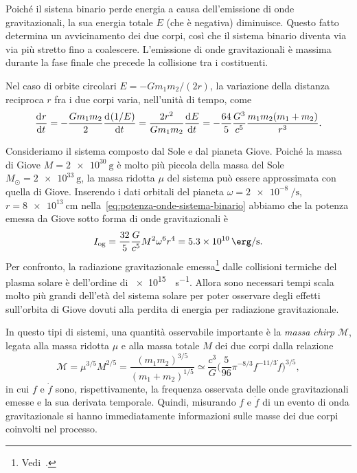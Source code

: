 Poiché il sistena binario perde energia a causa dell'emissione di onde
gravitazionali, la sua energia totale $E$ (che è negativa) diminuisce.  Questo
fatto determina un avvicinamento dei due corpi, così che il sistema binario
diventa via via più stretto fino a coalescere.  L'emissione di onde
gravitazionali è massima durante la fase finale che precede la collisione tra i
costituenti.

Nel caso di orbite circolari $E = -Gm_{1}m_{2}/(2r)$, la variazione della
distanza reciproca $r$ fra i due corpi varia, nell'unità di tempo, come
\begin{equation}
  \frac{{\mathop{}\!\mathrm{d}^{}}r}{\mathop{}\!\mathrm{d} {t}^{}} = -\frac{Gm_{1}m_{2}}{2} \frac{{\mathop{}\!\mathrm{d}^{}}(1/E)}{\mathop{}\!\mathrm{d} {t}^{}} =
  \frac{2r^{2}}{Gm_{1}m_{2}} \frac{{\mathop{}\!\mathrm{d}^{}}E}{\mathop{}\!\mathrm{d} {t}^{}} = -\frac{64}{5}\frac{G^{3}}{c^{5}}
  \frac{m_{1}m_{2}(m_{1} + m_{2})}{r^{3}}.
\end{equation}

Consideriamo il sistema composto dal Sole e dal pianeta Giove.  Poiché la massa
di Giove $M = \SI{2e30}{\gram}$ è molto più piccola della massa del Sole
$M_{\odot} = \SI{2e33}{\gram}$, la massa ridotta $\mu$ del sistema può essere
approssimata con quella di Giove.  Inserendo i dati orbitali del pianeta
$\omega = \SI[per-mode=reciprocal]{2e-8}{\per\second}$,
$r = \SI{8e13}{\centi\metre}$ nella~\eqref{eq:potenza-onde-sistema-binario}
abbiamo che la potenza emessa da Giove sotto forma di onde gravitazionali è
\begin{equation}
  I_{\textup{og}} = \frac{32}{5} \frac{G}{c^{5}} M^{2} \omega^{6} r^{4} =
  \SI{5.3e10}{\erg\per\second}.
\end{equation}
Per confronto, la radiazione gravitazionale
emessa\footnote{Vedi~\textcite[266]{weinberg:gravitation}.}  dalle collisioni
termiche del plasma solare è dell'ordine di \SI{e15}{\erg\per\second}.  Allora
sono necessari tempi scala molto più grandi dell'età del sistema solare per
poter osservare degli effetti sull'orbita di Giove dovuti alla perdita di
energia per radiazione gravitazionale.

In questo tipi di sistemi, una quantità osservabile importante è la \emph{massa
  chirp} \(\mathcal{M}\), legata alla massa ridotta \(\mu\) e alla massa totale
\(M\) dei due corpi dalla relazione~\parencite{2016PhRvL.116f1102A}
\begin{equation}
  \mathcal{M} = \mu^{3/5} M^{2/5} = \frac{(m_{1} m_{2})^{3/5}}{(m_{1} +
    m_{2})^{1/5}} \simeq \frac{c^{3}}{G} \biggl(\frac{5}{96} \pi^{-8/3}
  f^{-11/3} \dot{f}\biggr)^{3/5},
\end{equation}
in cui \(f\) e \(\dot{f}\) sono, rispettivamente, la frequenza osservata delle
onde gravitazionali emesse e la sua derivata temporale.  Quindi, misurando \(f\)
e \(\dot{f}\) di un evento di onda gravitazionale si hanno immediatamente
informazioni sulle masse dei due corpi coinvolti nel processo.

